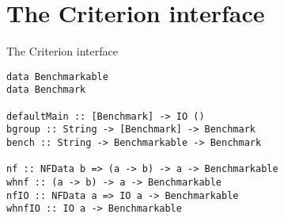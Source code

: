 \chapter{The Criterion interface}\label{ap:criterion}

\begin{listing}
  \caption{The Criterion interface}
  \begin{verbatim}
data Benchmarkable
data Benchmark

defaultMain :: [Benchmark] -> IO ()
bgroup :: String -> [Benchmark] -> Benchmark
bench :: String -> Benchmarkable -> Benchmark

nf :: NFData b => (a -> b) -> a -> Benchmarkable
whnf :: (a -> b) -> a -> Benchmarkable
nfIO :: NFData a => IO a -> Benchmarkable
whnfIO :: IO a -> Benchmarkable
  \end{verbatim}
  \label{code:criterion-api}
\end{listing}
